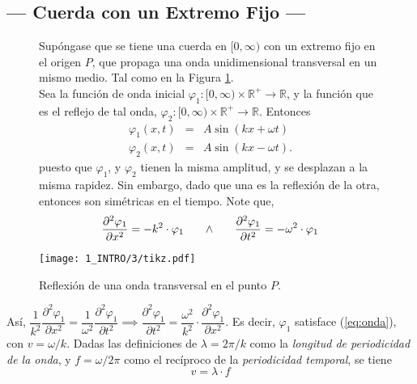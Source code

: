 \documentclass[10pt,a4paper]{article}
\begin{document}
\newpage

\subsection{--- Cuerda con un Extremo Fijo ---} %
\label{sub:cuerd_var}
\begin{figure}[ht]
	\begin{minipage}{0.4\linewidth}
		Supóngase que se tiene una cuerda en \([0, \infty)\) con un extremo fijo en el origen \(P\), que propaga una onda unidimensional transversal en un mismo medio.
		Tal como en la Figura \ref{fig:extr_libre}. \\[2mm]
		Sea la función de onda inicial \(\varphi_1 :[0, \infty ) \times \mathds{R} ^+ \longrightarrow \mathds{R}\), y la función que es el reflejo de tal onda, \(\varphi _2: [0, \infty ) \times \mathds{R} ^+ \longrightarrow \mathds{R}\).
		Entonces
		\[
			\begin{array}{rcl}
				\varphi _1(x,t) & = & A \sin (kx+ \omega t) \\
				\varphi _2(x,t) & = & A \sin (kx- \omega t) .
			\end{array}
		\]
		puesto que \(\varphi _1\), y \(\varphi _2\) tienen la misma amplitud, y se desplazan a la misma rapidez.
		Sin embargo, dado que una es la reflexión de la otra, entonces son simétricas en el tiempo.
		Note que,
		\[
			\dfrac{\partial ^2 \varphi _1}{\partial x^2} = -k^2 \cdot \varphi _1 \hspace{5mm} \;\land\; \hspace{5mm} \dfrac{\partial ^2 \varphi _1}{\partial t^2} = -\omega ^2 \cdot \varphi _1
		\]
	\end{minipage}\hspace{5mm}
	\begin{minipage}{0.6\linewidth}
		\texttt{[image: 1\_INTRO/3/tikz.pdf]}
		\caption{Reflexión de una onda transversal en el punto \(P\).}
		\label{fig:extr_libre}
	\end{minipage}
\end{figure}
Así, \(\dfrac{1}{k^2} \dfrac{\partial ^2 \varphi _1}{\partial x^2} = \dfrac{1}{\omega ^2} \dfrac{\partial ^2 \varphi _1}{\partial t^2} \implies \dfrac{\partial ^2 \varphi _1}{\partial t^2} = \dfrac{\omega ^2}{k^2} \cdot \dfrac{\partial ^2 \varphi _1}{\partial x^2}\).
Es decir, \(\varphi _1\) satisface (\ref{eq:onda}), con \(v= \omega /k\).
Dadas las definiciones de \(\lambda = 2 \pi /k\) como la \textit{longitud de periodicidad de la onda}, y \(f = \omega /2 \pi\) como el recíproco de la \textit{periodicidad temporal}, se tiene
\begin{equation}
	v = \lambda \cdot f
	\label{eq:velocidad_1}
\end{equation}
\end{document}
